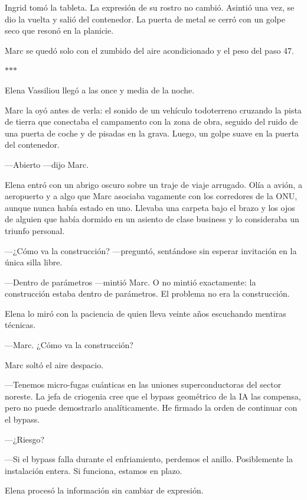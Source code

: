 \documentclass[11pt,a5paper,twoside]{book}
\begin{document}
Ingrid tomó la tableta. La expresión de su rostro no cambió. Asintió una vez, se dio la vuelta y salió del contenedor. La puerta de metal se cerró con un golpe seco que resonó en la planicie.

Marc se quedó solo con el zumbido del aire acondicionado y el peso del paso 47.

\vspace{1.5em}
\begin{center}$\ast$\quad$\ast$\quad$\ast$\end{center}
\vspace{1.5em}

Elena Vassiliou llegó a las once y media de la noche.

Marc la oyó antes de verla: el sonido de un vehículo todoterreno cruzando la pista de tierra que conectaba el campamento con la zona de obra, seguido del ruido de una puerta de coche y de pisadas en la grava. Luego, un golpe suave en la puerta del contenedor.

—Abierto —dijo Marc.

Elena entró con un abrigo oscuro sobre un traje de viaje arrugado. Olía a avión, a aeropuerto y a algo que Marc asociaba vagamente con los corredores de la ONU, aunque nunca había estado en uno. Llevaba una carpeta bajo el brazo y los ojos de alguien que había dormido en un asiento de clase business y lo consideraba un triunfo personal.

—¿Cómo va la construcción? —preguntó, sentándose sin esperar invitación en la única silla libre.

—Dentro de parámetros —mintió Marc. O no mintió exactamente: la construcción estaba dentro de parámetros. El problema no era la construcción.

Elena lo miró con la paciencia de quien lleva veinte años escuchando mentiras técnicas.

—Marc. ¿Cómo va la construcción?

Marc soltó el aire despacio.

—Tenemos micro-fugas cuánticas en las uniones superconductoras del sector noreste. La jefa de criogenia cree que el bypass geométrico de la IA las compensa, pero no puede demostrarlo analíticamente. He firmado la orden de continuar con el bypass.

—¿Riesgo?

—Si el bypass falla durante el enfriamiento, perdemos el anillo. Posiblemente la instalación entera. Si funciona, estamos en plazo.

Elena procesó la información sin cambiar de expresión.
\end{document}
